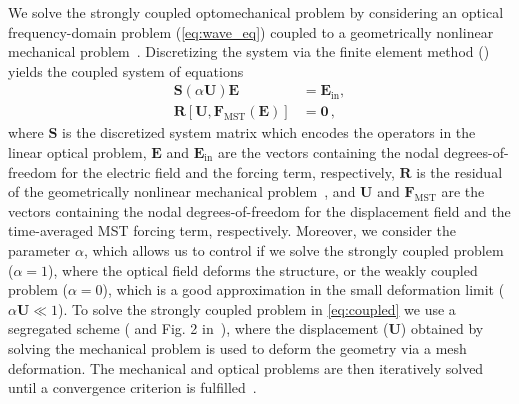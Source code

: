 We solve the strongly coupled optomechanical problem by considering an optical frequency-domain problem (\eqref{eq:wave_eq}) coupled to a geometrically nonlinear mechanical problem~\cite{ownpub5,cook_concepts_2001}. Discretizing the system via the finite element
method () yields the coupled system of equations
\begin{equation}\label{eq:coupled}
    \begin{aligned}
 \mathbf{S}\left(\alpha\mathbf{U}\right) \mathbf{E} &= \mathbf{E}_\text{in} , \\
 \mathbf{R}[\mathbf{U}, \mathbf{F}_\text{MST}(\mathbf{E})] &=\mathbf{0}\,,
    \end{aligned}
    \end{equation}
where $\mathbf{S}$ is the discretized system matrix which encodes the operators
 in the linear optical problem, $\mathbf{E}$ and 
 $\mathbf{E}_\text{in}$ are the vectors containing the nodal degrees-of-freedom for the electric 
field and the forcing term, respectively, $\mathbf{R}$ is the residual of the
 geometrically nonlinear mechanical problem~\cite{cook_concepts_2001}, and 
 $\mathbf{U}$ and $\mathbf{F}_\text{MST}$ are the vectors containing the nodal
 degrees-of-freedom for the displacement field and the time-averaged MST forcing term, respectively. 
 Moreover, we consider the parameter $\alpha$, which allows us to control if we solve 
 the strongly coupled problem ($\alpha=1$), where the optical field deforms the structure, 
 or the weakly coupled problem ($\alpha=0$), which is a good approximation in the small deformation 
 limit ($\alpha\mathbf{U} \ll 1$). To solve the strongly coupled problem in 
  \eqref{eq:coupled} we use a segregated scheme ( and Fig. 2 in~\cite{ownpub5}), where the displacement ($\mathbf{U}$) obtained
 by solving the mechanical problem is used to deform the geometry via a mesh deformation. The mechanical and
 optical problems are then iteratively solved until a convergence criterion is fulfilled~\cite {ownpub5}.

